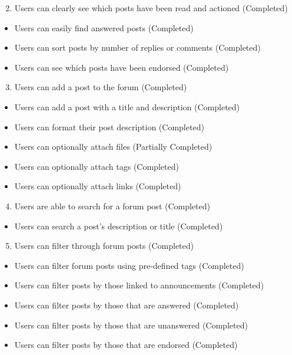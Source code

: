 \begin{enumerate}
    \setcounter{enumi}{1}
    \item Users can clearly see which posts have been read and actioned (Completed)
\end{enumerate}
\begin{itemize}
    \setlength{\itemindent}{1.5em}
    \item Users can easily find answered posts (Completed)
    \item Users can sort posts by number of replies or comments (Completed)
    \item Users can see which posts have been endorsed (Completed)
\end{itemize}

\begin{enumerate}
    \setcounter{enumi}{2}
    \item Users can add a post to the forum (Completed)
\end{enumerate}
\begin{itemize}
    \setlength{\itemindent}{1.5em}
    \item Users can add a post with a title and description (Completed)
    \item Users can format their post description (Completed)
    \item Users can optionally attach files (Partially Completed)
    \item Users can optionally attach tags (Completed)
    \item Users can optionally attach links (Completed)
\end{itemize}

\begin{enumerate}
    \setcounter{enumi}{3}
    \item Users are able to search for a forum post (Completed)
\end{enumerate}
\begin{itemize}
    \setlength{\itemindent}{1.5em}
    \item Users can search a post's description or title (Completed)
\end{itemize}

\begin{enumerate}
    \setcounter{enumi}{4}
    \item Users can filter through forum posts (Completed)
\end{enumerate}
\begin{itemize}
    \setlength{\itemindent}{1.5em}
    \item Users can filter forum posts using pre-defined tags (Completed)
    \item Users can filter posts by those linked to announcements (Completed)
    \item Users can filter posts by those that are answered (Completed)
    \item Users can filter posts by those that are unanswered (Completed)
    \item Users can filter posts by those that are endorsed (Completed)
\end{itemize}

